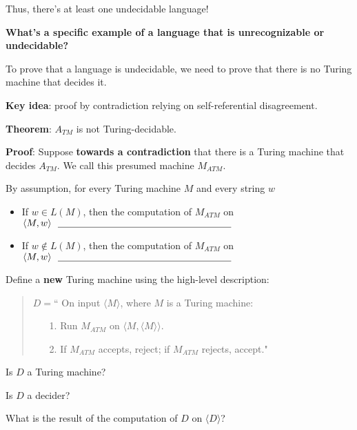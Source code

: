 \documentclass[12pt, oneside]{article}
\begin{document}
    
    Thus, there's at least one undecidable language!
    
    \vfill
    
    {\bf What's a specific example of a language that is unrecognizable or undecidable?}
    
    To prove that a language is undecidable, we need to prove that there is no Turing machine that decides it.
    
    {\bf Key idea}: proof by contradiction relying on self-referential disagreement.
    
    

{\bf  Theorem}: $A_{TM}$  is  not  Turing-decidable.

{\bf  Proof}: Suppose {\bf towards a  contradiction}  that there  is a Turing machine  that decides $A_{TM}$.  
We call this presumed machine  $M_{ATM}$.

By  assumption, for every  Turing machine  $M$ and every  string $w$

\begin{itemize}
\item If $w \in L(M)$, then  the computation of $M_{ATM}$  on  $\langle M,w \rangle ~~ \underline{\phantom{\hspace{2.5in}}}$
\item If $w \notin L(M)$, then  the computation of $M_{ATM}$  on  $\langle M,w \rangle ~~ \underline{\phantom{\hspace{2.5in}}}$
\end{itemize}


Define  a {\bf new} Turing machine using  the high-level description:
\begin{quote}
$D =  $`` On  input $\langle M \rangle$, where  $M$  is  a Turing machine:
\begin{itemize}
\item[1.] Run  $M_{ATM}$ on  $\langle M, \langle M \rangle  \rangle$.
\item[2.] If $M_{ATM}$ accepts, reject; if  $M_{ATM}$ rejects, accept."
\end{itemize}
\end{quote}


Is $D$ a  Turing machine?

\vspace{30pt}

Is  $D$ a  decider? 

\vspace{30pt}

What is the result of the computation  of $D$  on  $\langle D \rangle$?
\end{document}
